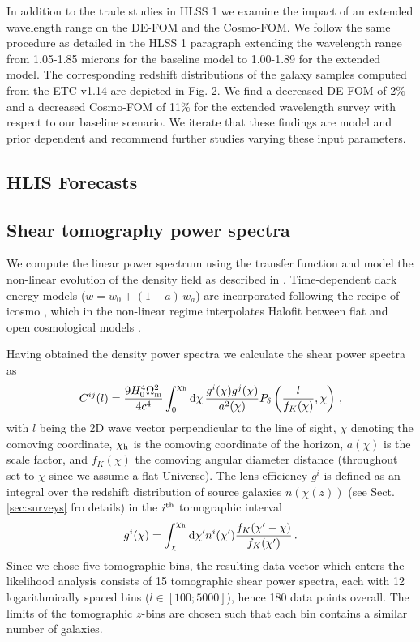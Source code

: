 In addition to the trade studies in HLSS 1 we examine the impact of an extended wavelength range on the DE-FOM and the Cosmo-FOM. We follow the same procedure as detailed in the HLSS 1 paragraph extending the wavelength range from 1.05-1.85 microns for the baseline model to 1.00-1.89 for the extended model. The corresponding redshift distributions of the galaxy samples computed from the ETC v1.14 are depicted in Fig. 2. We find a decreased DE-FOM of 2\% and a decreased Cosmo-FOM of 11\% for the extended wavelength survey with respect to our baseline scenario. We iterate that these findings are model and prior dependent and recommend further studies varying these input parameters.

\subsection{HLIS Forecasts}
\label{sec:lensingbasics}
\subsection{Shear tomography power spectra}
\label{sec:powerbasics}

We compute the linear power spectrum using the \cite{eh99} transfer function and model the non-linear evolution of the density field as described in \cite{tsn12}.
Time-dependent dark energy models ($w=w_0+(1-a)\,w_a$) are incorporated following the recipe of {\sc icosmo} \citep{rak11}, which in the non-linear regime interpolates Halofit between flat and open cosmological models \citep[also see][for more details]{shj10}.

Having obtained the density power spectra we calculate the shear power spectra as
\begin{equation}
\label{eq:pdeltatopkappa}
C ^{ij} (l) = \frac{9H_0^4 \Omega_\mathrm m^2}{4c^4} \int_0^{\chi_\mathrm h} 
\mathrm d \chi \, \frac{g^{i}(\chi) g^{j}(\chi)}{a^2(\chi)} P_{\delta} \left(\frac{l}{f_K(\chi)},\chi \right) \,,
\end{equation}
with $l$ being the 2D wave vector perpendicular to the line of sight, $\chi$ denoting the comoving coordinate, $\chi_\mathrm h$ is the comoving coordinate of the horizon, $a(\chi)$ is the scale factor, and $f_K(\chi)$ the comoving angular diameter distance (throughout set to $\chi$ since we assume a flat Universe). The lens efficiency $g^{i}$ is defined as an integral over the redshift distribution of source galaxies $n(\chi(z))$ (see Sect. \ref{sec:surveys} fro details) in the $i^\mathrm{th}$ tomographic interval
\begin{equation}
\label{eq:redshift_distri}
g^{i}(\chi) = \int_\chi^{\chi_{\mathrm h}} \mathrm d \chi' n^{i} (\chi') \frac{f_K (\chi'-\chi)}{f_K (\chi')} \,.
\end{equation}
Since we chose five tomographic bins, the resulting data vector which enters the likelihood analysis consists of 15 tomographic shear power spectra, each with 12 logarithmically spaced bins ($l \in [100;5000]$), hence 180 data points overall. The limits of the tomographic $z$-bins are chosen such that each bin contains a similar number of galaxies.


